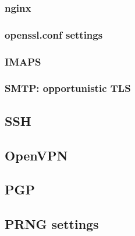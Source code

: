 


\subsubsection{nginx}


\subsubsection{openssl.conf settings}


\subsubsection{IMAPS}
\subsubsection{SMTP: opportunistic TLS}

\subsection{SSH}

\subsection{OpenVPN}

\subsection{PGP}

\subsection{PRNG settings}
